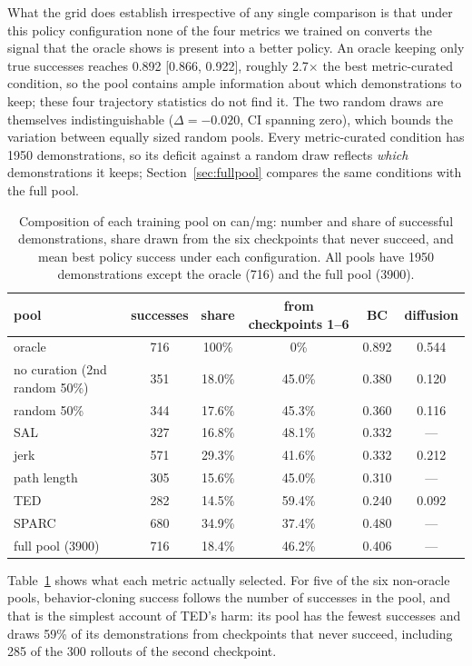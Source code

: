 \documentclass[10pt]{article}
\begin{document}
What the grid does establish irrespective of any single comparison is that
under this policy configuration none of the four metrics we trained on
converts the signal that the oracle shows is present into a better policy.
An oracle keeping only true successes reaches 0.892 [0.866, 0.922], roughly
2.7$\times$ the best metric-curated condition, so the pool contains ample
information about which demonstrations to keep; these four trajectory
statistics do not find it. The two random draws are themselves indistinguishable
($\Delta = -0.020$, CI spanning zero), which bounds the variation between
equally sized random pools. Every metric-curated condition has 1950
demonstrations, so its deficit against a random draw reflects \emph{which}
demonstrations it keeps; Section~\ref{sec:fullpool} compares the same
conditions with the full pool.

\begin{table}[t]
\centering
\small
\begin{tabular}{lccccc}
\toprule
pool & successes & share & from checkpoints 1--6 & BC & diffusion \\
\midrule
oracle                  & 716 & 100\%  & 0\%    & 0.892 & 0.544 \\
no curation (2nd random 50\%) & 351 & 18.0\% & 45.0\% & 0.380 & 0.120 \\
random 50\%             & 344 & 17.6\% & 45.3\% & 0.360 & 0.116 \\
SAL                     & 327 & 16.8\% & 48.1\% & 0.332 & --- \\
jerk                    & 571 & 29.3\% & 41.6\% & 0.332 & 0.212 \\
path length             & 305 & 15.6\% & 45.0\% & 0.310 & --- \\
TED                     & 282 & 14.5\% & 59.4\% & 0.240 & 0.092 \\
\midrule
SPARC                   & 680 & 34.9\% & 37.4\% & 0.480 & --- \\
full pool (3900)        & 716 & 18.4\% & 46.2\% & 0.406 & --- \\
\bottomrule
\end{tabular}
\caption{Composition of each training pool on can/mg: number and share of
successful demonstrations, share drawn from the six checkpoints that never
succeed, and mean best policy success under each configuration. All pools
have 1950 demonstrations except the oracle (716) and the full pool (3900).}
\label{tab:pools}
\end{table}

Table~\ref{tab:pools} shows what each metric actually selected. For five of
the six non-oracle pools, behavior-cloning success follows the number of
successes in the pool, and that is the simplest account of TED's harm: its
pool has the fewest successes and draws 59\% of its demonstrations from
checkpoints that never succeed, including 285 of the 300 rollouts of the
second checkpoint.
\end{document}
